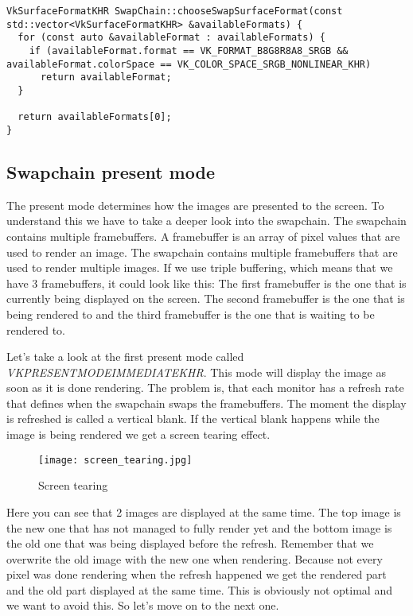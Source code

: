 \documentclass[12pt]{report} \usepackage{preamble}
\begin{document}
\begin{lstlisting}[Language=C++]
VkSurfaceFormatKHR SwapChain::chooseSwapSurfaceFormat(const std::vector<VkSurfaceFormatKHR> &availableFormats) {
  for (const auto &availableFormat : availableFormats) {
    if (availableFormat.format == VK_FORMAT_B8G8R8A8_SRGB && availableFormat.colorSpace == VK_COLOR_SPACE_SRGB_NONLINEAR_KHR)
      return availableFormat;
  }

  return availableFormats[0];
}
\end{lstlisting}

\subsection{Swapchain present mode}

The present mode determines how the images are presented to the screen. To understand this we
have to take a deeper look into the swapchain. The swapchain contains multiple framebuffers.
A framebuffer is an array of pixel values that are used to render an image. The swapchain
contains multiple framebuffers that are used to render multiple images.
If we use triple buffering, which means that we have 3 framebuffers, it could look like this:
The first framebuffer is the one that is currently being displayed on the screen.
The second framebuffer is the one
that is being rendered to and the third framebuffer is the one that is waiting to be rendered to.

Let's take a look at the first present mode called \\
\textit{VK\textunderscore PRESENT\textunderscore MODE\textunderscore IMMEDIATE\textunderscore KHR}.
This mode will display the image as soon as it is done rendering.
The problem is, that each monitor has a refresh rate that defines when the swapchain
swaps the framebuffers. The moment the display is refreshed is called a vertical blank.
If the vertical blank happens while the image is being rendered we get a screen tearing effect.

\begin{figure}[htbp]
	\centering
	\texttt{[image: screen\_tearing.jpg]}
	\caption{Screen tearing} \cite{fig:screen_tearing}
\end{figure}

Here you can see that 2 images are displayed at the same time. The top image is the new one that has
not managed to fully render yet and the bottom image is the old one that was being displayed before the
refresh. Remember that we overwrite the old image with the new one when rendering. Because not every pixel
was done rendering when the refresh happened we get the rendered part and the old part displayed at the same time.
This is obviously not optimal and we want to avoid this. So let's move on to the next one.
\end{document}

